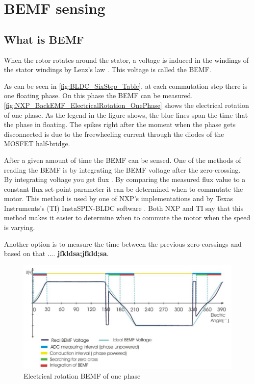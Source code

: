 \documentclass[]{report}
\begin{document}

\section{BEMF sensing}
\subsection{What is BEMF}
When the rotor rotates around the stator, a voltage is induced in the windings of the stator windings by Lenz's law \cite{Faradays_Law_concepts}. This voltage is called the BEMF.

As can be seen in \autoref{fig:BLDC_SixStep_Table}, at each commutation step there is one floating phase. On this phase the BEMF can be measured. \autoref{fig:NXP_BackEMF_ElectricalRotation_OnePhase} shows the electrical rotation of one phase. As the legend in the figure shows, the blue lines span the time that the phase in floating. The spikes right after the moment when the phase gets disconnected is due to the freewheeling current through the diodes of the MOSFET half-bridge.

After a given amount of time the BEMF can be sensed. One of the methods of reading the BEMF is by integrating the BEMF voltage after the zero-crossing. By integrating voltage you get flux \cite{TI_InstaSPIN_BLDC}. By comparing the measured flux value to a constant flux set-point parameter it can be determined when to commutate the motor. This method is used by one of NXP's implementations \cite{NXP_AN4597} and by Texas Instruments's (TI) InstaSPIN-BLDC software \cite{TI_InstaSPIN_BLDC}. Both NXP and TI say that this method makes it easier to determine when to commute the motor when the speed is varying.

Another option is to measure the time between the previous zero-corssings and based on that .... \textbf{jfkldsa;jfkld;sa}.

\begin{figure}[H]
	\centering
	\includegraphics[width=\textwidth]{NXP_BackEMF_ElectricalRotation_OnePhase.JPG}
	\caption{Electrical rotation BEMF of one phase \cite{NXP_AN4597}}
	\label{fig:NXP_BackEMF_ElectricalRotation_OnePhase}
\end{figure}
\end{document}
